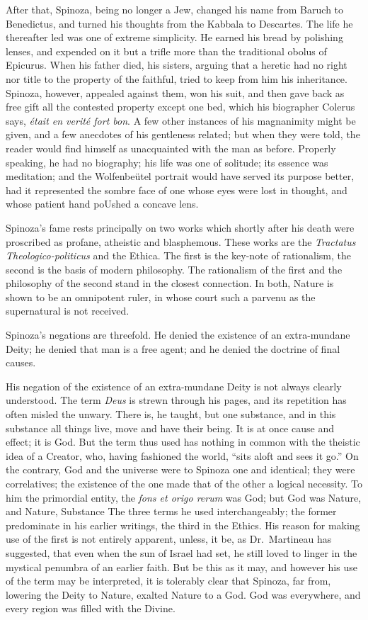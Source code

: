 \documentclass[]{book}
\begin{document}
After that, Spinoza, being no longer a Jew, changed his name from Baruch
to Benedictus, and turned his thoughts from the Kabbala to Descartes.
The life he thereafter led was one of extreme simplicity. He earned his
bread by polishing lenses, and expended on it but a trifle more than the
traditional obolus of Epicurus. When his father died, his sisters,
arguing that a heretic had no right nor title to the property of the
faithful, tried to keep from him his inheritance. Spinoza, however,
appealed against them, won his suit, and then gave back as free gift all
the contested property except one bed, which his biographer Colerus
says, \emph{était en verité fort bon}. A few other instances of his
magnanimity might be given, and a few anecdotes of his gentleness
related; but when they were told, the reader would find himself as
unacquainted with the man as before. Properly speaking, he had no
biography; his life was one of solitude; its essence was meditation; and
the Wolfenbeütel portrait would have served its purpose better, had it
represented the sombre face of one whose eyes were lost in thought, and
whose patient hand poUshed a concave lens.

Spinoza's fame rests principally on two works which shortly after his
death were proscribed as profane, atheistic and blasphemous. These works
are the \emph{Tractatus Theologico-politicus} and the Ethica. The first
is the key-note of rationalism, the second is the basis of modern
philosophy. The rationalism of the first and the philosophy of the
second stand in the closest connection. In both, Nature is shown to be
an omnipotent ruler, in whose court such a parvenu as the supernatural
is not received.

Spinoza's negations are threefold. He denied the existence of an
extra-mundane Deity; he denied that man is a free agent; and he denied
the doctrine of final causes.

His negation of the existence of an extra-mundane Deity is not always
clearly understood. The term \emph{Deus} is strewn through his pages,
and its repetition has often misled the unwary. There is, he taught, but
one substance, and in this substance all things live, move and have
their being. It is at once cause and effect; it is God. But the term
thus used has nothing in common with the theistic idea of a Creator,
who, having fashioned the world, ``sits aloft and sees it go.'' On the
contrary, God and the universe were to Spinoza one and identical; they
were correlatives; the existence of the one made that of the other a
logical necessity. To him the primordial entity, the \emph{fons et origo
rerum} was God; but God was Nature, and Nature, Substance The three
terms he used interchangeably; the former predominate in his earlier
writings, the third in the Ethics. His reason for making use of the
first is not entirely apparent, unless, it be, as Dr.~Martineau has
suggested, that even when the sun of Israel had set, he still loved to
linger in the mystical penumbra of an earlier faith. But be this as it
may, and however his use of the term may be interpreted, it is tolerably
clear that Spinoza, far from, lowering the Deity to Nature, exalted
Nature to a God. God was everywhere, and every region was filled with
the Divine.
\end{document}
